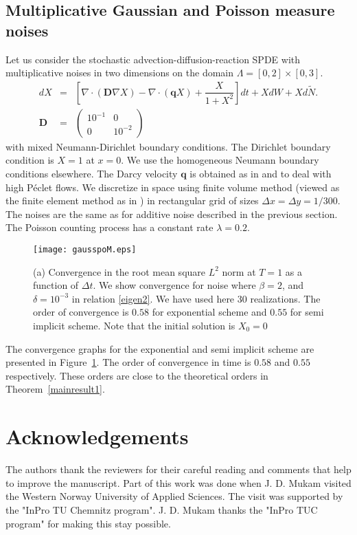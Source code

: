 \documentclass[review,12pt]{elsarticle}
\newcommand{\figref}[1]{{Figure~\ref{#1}}}
\newcommand{\Dt}{\Delta t}
\newcommand{\thmref}[1]{{Theorem~\ref{#1}}}
\begin{document}
\subsection{Multiplicative Gaussian and Poisson measure noises}
Let us consider  the stochastic advection-diffusion-reaction SPDE with multiplicative noises in two dimensions on the domain $\Lambda=[0,2]\times[0,3]$. 
\begin{eqnarray}
\label{reactiondif1}
dX&=&\left[\nabla \cdot (\mathbf{D}\nabla X)-\nabla \cdot(\mathbf{q}X) +\dfrac{X}{1+X^2}\right]dt+XdW+Xd\widetilde{N}.\\
\mathbf{D}&=&\left( \begin{array}{cc}
             10^{-1}&0\\
             0& 10^{-2}
             \end{array}\right)
\end{eqnarray}
with mixed Neumann-Dirichlet boundary conditions. The Dirichlet boundary condition is $X=1$ at $x=0$. 
 We use the homogeneous Neumann boundary conditions elsewhere. The Darcy velocity  $\mathbf{q}$ is obtained as in \cite{Antonio1}  and  to deal with high  P\'{e}clet flows.
We discretize in space using finite volume method (viewed as the finite element method as in \cite{Antonio1}) in rectangular grid of sizes $\Delta x=\Delta y= 1/300$. 
The noises are the same as for additive noise described in the previous section.  The Poisson counting process has a constant  rate $\lambda=0.2$.
\begin{figure}[!ht]
    \label{FIGII}
    \texttt{[image: gausspoM.eps]}
  \caption{(a) Convergence in the root mean square $L^{2}$ norm at $T=1$ as a
    function of $\Dt$. We show convergence for noise  where 
    $\beta=2$, and  $\delta=10^{-3}$ in relation \eqref{eigen2}. We have  used here 30 realizations.  The order of convergence is $0.58$ for exponential scheme and $0.55$ for semi implicit scheme.
    Note that the initial solution is $X_0=0$ 
    } 
  \label{FIGII} 
  \end{figure}
 The convergence graphs for the exponential and semi implicit scheme are presented in \figref{FIGII}. The order of convergence in time is $0.58$ and $0.55$ respectively.  
  These orders are close to the theoretical  orders in \thmref{mainresult1}.


\section*{Acknowledgements}
The authors thank the reviewers for their careful reading and comments that help to improve the manuscript.  Part of this work was done when J. D. Mukam visited the Western Norway University of Applied Sciences. The visit  was supported by the "InPro TU Chemnitz program". J. D. Mukam thanks the "InPro TUC program" for making this stay possible. 
\end{document}
